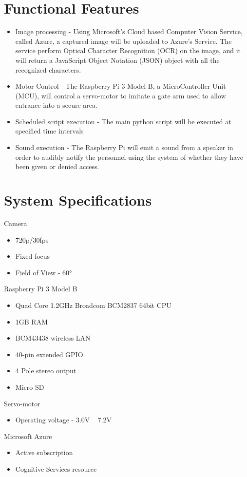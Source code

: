 \documentclass[a4paper,12pt]{article}
\begin{document}
\newpage
\section{Functional Features}
\begin{itemize}
    \item Image processing - Using Microsoft's Cloud based Computer Vision Service, called Azure, a captured image will be uploaded to Azure's Service. The service perform Optical Character Recognition (OCR) on the image, and it will return a JavaScript Object Notation (JSON) object with all the recognized characters.
    \item Motor Control - The Raspberry Pi 3 Model B, a MicroController Unit (MCU), will control a servo-motor to imitate a gate arm used to allow entrance into a secure area.
    \item Scheduled script execution - The main python script will be executed at specified time intervals
    \item Sound execution - The Raspberry Pi will emit a sound from a speaker in order to audibly notify the personnel using the system of whether they have been given or denied access.
\end{itemize}

\newpage
\section{System Specifications}
Camera
\begin{itemize}
    \item 720p/30fps
    \item Fixed focus
    \item Field of View - \ang{60}
\end{itemize}
Raspberry Pi 3 Model B
\begin{itemize}
    \item Quad Core 1.2GHz Broadcom BCM2837 64bit CPU
    \item 1GB RAM
    \item BCM43438 wireless LAN
    \item 40-pin extended GPIO
    \item 4 Pole stereo output
    \item Micro SD
\end{itemize}
Servo-motor
\begin{itemize}
    \item Operating voltage - 3.0V ~ 7.2V
\end{itemize}
Microsoft Azure
\begin{itemize}
    \item Active subscription
    \item Cognitive Services resource
\end{itemize}
\end{document}
